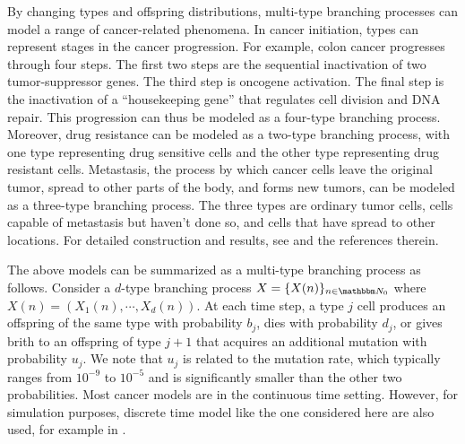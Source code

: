 \documentclass[11pt]{article}
\theoremstyle{plain}
\theoremstyle{definition}
\numberwithin{equation}{section}
\newcommand{\BB}{\mathbbm}
\begin{document}
By changing types and offspring distributions, multi-type branching processes can model a range of cancer-related phenomena. In cancer initiation, types can represent stages in the cancer progression. For example, colon cancer progresses through four steps. The first two steps are the sequential inactivation of two tumor-suppressor genes. The third step is oncogene activation. The final step is the inactivation of a ``housekeeping gene'' that regulates cell division and DNA repair. This progression can thus be modeled as a four-type branching process. Moreover, drug resistance can be modeled as a two-type branching process, with one type representing drug sensitive cells and the other type representing drug resistant cells. Metastasis, the process by which cancer cells leave the original tumor, spread to other parts of the body, and forms new tumors, can be modeled as a three-type branching process. The three types are ordinary tumor cells, cells capable of metastasis but haven't done so, and cells that have spread to other locations. For detailed construction and results, see \cite{Durrett2015cancer} and the references therein.

The above models can be summarized as a multi-type branching process as follows. Consider a $d$-type branching process $X=\{X(n)\}_{n\in \BB N_0}$ where $X(n)=(X_1(n), \cdots, X_d(n))$. At each time step, a type $j$ cell produces an offspring of the same type with probability $b_j$, dies with probability $d_j$, or gives brith to an offspring of type $j+1$ that acquires an additional mutation with probability $u_j$. We note that $u_j$ is related to the mutation rate, which typically ranges from $10^{-9}$ to $10^{-5}$ and is significantly smaller than the other two probabilities. Most cancer models are in the continuous time setting. However, for simulation purposes, discrete time model like the one considered here are also used, for example in \cite{Bozic2010}. 
\end{document}
